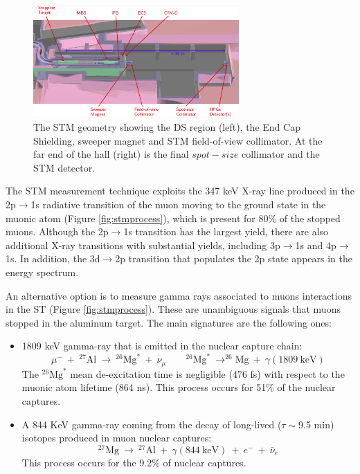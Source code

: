 \begin{figure}[!h]
    \centering
    \includegraphics[width =0.7\textwidth]{figures/png/Screenshot_20240306_180910.png}
    \caption[The Stopping Target Monitor geometry.]{The STM geometry showing the DS region (left), 
    the End Cap Shielding, sweeper magnet and STM field-of-view collimator. 
    At the far end of the hall (right) is the final $spot-size$ collimator and the STM detector.}
    \label{fig:stm}
    \end{figure}
    The STM measurement technique exploits the 347 keV X-ray line produced in the 2p$\rightarrow$1s 
    radiative transition of the muon moving to the ground state in the muonic atom (Figure \ref{fig:stmprocess}), 
    which is present for 80\% of the stopped muons. Although the 2p$\rightarrow$1s transition has the 
    largest yield, there are also additional X-ray transitions with substantial yields, 
    including 3p$\rightarrow$1s and 4p$\rightarrow$1s. In addition, the 3d$\rightarrow$2p 
    transition that populates the 2p state appears in the energy spectrum.

    An alternative option is to measure gamma rays associated 
    to muons interactions in the ST (Figure \ref{fig:stmprocess}).
    These are unambiguous signals that muons stopped in the aluminum target. 
    The main signatures are the following ones: 
    \begin{itemize}
    \item 1809 keV gamma-ray that is emitted in the nuclear capture chain:
    \begin{equation}
        \mu^- \ + \ ^{27}\text{Al} \ \rightarrow \ ^{26}\text{Mg}^* \ + \ \nu_\mu \quad \quad ^{26}\text{Mg}^* \ \rightarrow ^{26}\text{Mg} \ + \ \gamma(1809 \ \text{keV})
     \end{equation}
     The $^{26}\text{Mg}^*$ mean de-excitation time is negligible (476 fs) with 
     respect to the muonic atom lifetime (864 ns). 
     This process occurs for 51\% of the nuclear captures.
     \item  A 844 KeV gamma-ray coming from the decay of 
       long-lived ($\tau \sim$9.5 min) isotopes produced in muon nuclear captures:       
     \begin{equation}
        ^{27}\text{Mg} \ \rightarrow \ ^{27}\text{Al} \ + \ \gamma(844 \ \text{keV}) \ + \ e^- \ + \ \bar{\nu}_e
     \end{equation}
     This process occurs for the 9.2\% of nuclear captures.
\end{itemize}


